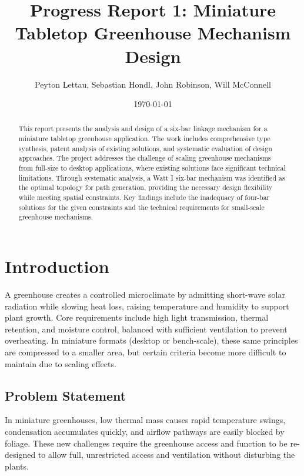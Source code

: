 \documentclass[12pt]{article}
\title{Progress Report 1: Miniature Tabletop Greenhouse Mechanism Design}
\author{Peyton Lettau, Sebastian Hondl, John Robinson, Will McConnell}
\date{\today}
\begin{document}
\maketitle

\begin{abstract}
This report presents the analysis and design of a six-bar linkage mechanism for a miniature tabletop greenhouse application. The work includes comprehensive type synthesis, patent analysis of existing solutions, and systematic evaluation of design approaches. The project addresses the challenge of scaling greenhouse mechanisms from full-size to desktop applications, where existing solutions face significant technical limitations. Through systematic analysis, a Watt I six-bar mechanism was identified as the optimal topology for path generation, providing the necessary design flexibility while meeting spatial constraints. Key findings include the inadequacy of four-bar solutions for the given constraints and the technical requirements for small-scale greenhouse mechanisms.
\end{abstract}

\tableofcontents
\newpage

\section{Introduction}
\label{sec:introduction}

A greenhouse creates a controlled microclimate by admitting short-wave solar radiation while slowing heat loss, raising temperature and humidity to support plant growth. Core requirements include high light transmission, thermal retention, and moisture control, balanced with sufficient ventilation to prevent overheating. In miniature formats (desktop or bench-scale), these same principles are compressed to a smaller area, but certain criteria become more difficult to maintain due to scaling effects.

\subsection{Problem Statement}
\label{sec:problem_statement}

In miniature greenhouses, low thermal mass causes rapid temperature swings, condensation accumulates quickly, and airflow pathways are easily blocked by foliage. These new challenges require the greenhouse access and function to be re-designed to allow full, unrestricted access and ventilation without disturbing the plants.
\end{document}
